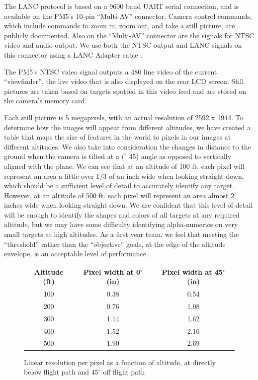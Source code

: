 \documentclass[pdftex,10pt,letter]{article}
\newcommand{\degrees}[1]
{
\begin{math}
#1^{\circ} 
\end{math}
}
\begin{document}
The LANC protocol is based on a 9600 baud UART serial connection, and is available on the PM5's 10-pin ``Multi-AV'' connector. Camera control commands, which include commands to zoom in, zoom out, and take a still picture, are publicly documented.  Also on the ``Multi-AV'' connector are the signals for NTSC video and audio output. We use both the NTSC output and LANC signals on this connector using a LANC Adapter cable \cite{lanc_adapter}.

The PM5's NTSC video signal outputs a 480 line video of the current ``viewfinder'', the live video that is also displayed on the rear LCD screen.  Still pictures are taken based on targets spotted in this video feed and are stored on the camera's memory card.

Each still picture is 5 megapixels, with an actual resolution of 2592 x 1944.  To determine how the images will appear from different altitudes, we have created a table that maps the size of features in the world to pixels in our images at different altitudes.  We also take into consideration the changes in distance to the ground when the camera is tilted at a \degrees(45) angle as opposed to vertically aligned with the plane.  We can see that at an altitude of 100 ft. each pixel will represent an area a little over $1/3$ of an inch wide when looking straight down, which should be a sufficient level of detail to accurately identify any target.  However, at an altitude of 500 ft. each pixel will represent an area almost 2 inches wide when looking straight down.  We are confident that this level of detail will be enough to identify the shapes and colors of all targets at any required altitude, but we may have some difficulty identifying alpha-numerics on very small targets at high altitudes.  As a first year team, we feel that meeting the ``threshold'' rather than the ``objective'' goals, at the edge of the altitude envelope, is an acceptable level of performance.

\begin{figure} [H]
	\centering
		\begin{tabular}{ccc}
		\\{\bf Altitude (ft)} & {\bf Pixel width at 0$^{\circ}$ (in)} & {\bf Pixel width at 45$^{\circ}$ (in)} \\
	       100 &       0.38 &       0.54 \\
	       200 &       0.76 &       1.08 \\
	       300 &       1.14 &       1.62 \\
	       400 &       1.52 &       2.16 \\
	       500 &       1.90 &       2.69 \\
		\end{tabular}
		\caption[Pixel Width Mapping]{Linear resolution per pixel as a function of altitude, at directly below flight path and \degrees{45} off flight path}
		\label{fig:pixelmapping}
\end{figure}
\end{document}
